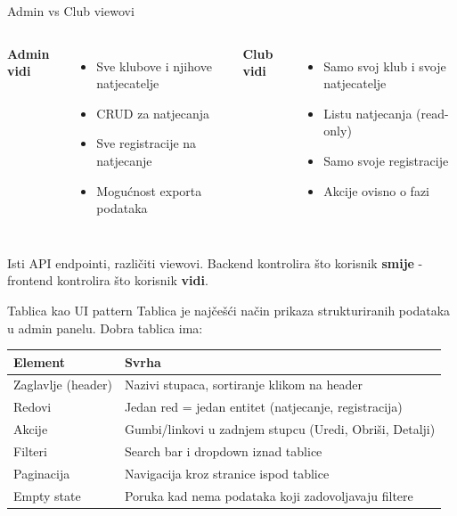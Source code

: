 \begin{frame}{Admin vs Club viewovi}
\begin{columns}[T]
\textbf{Admin vidi}
\begin{itemize}
  \item Sve klubove i njihove natjecatelje
  \item CRUD za natjecanja
  \item Sve registracije na natjecanje
  \item Mogućnost exporta podataka
\end{itemize}

\textbf{Club vidi}
\begin{itemize}
  \item Samo svoj klub i svoje natjecatelje
  \item Listu natjecanja (read-only)
  \item Samo svoje registracije
  \item Akcije ovisno o fazi
\end{itemize}
\end{columns}

\vspace{0.6em}
Isti API endpointi, različiti viewovi. Backend kontrolira što korisnik \textbf{smije} - frontend kontrolira što korisnik \textbf{vidi}.
\end{frame}

\begin{frame}{Tablica kao UI pattern}
Tablica je najčešći način prikaza strukturiranih podataka u admin panelu. Dobra tablica ima:

\vspace{0.4em}
\begin{tabular}{@{}lp{8cm}@{}}
  \toprule
  \textbf{Element} & \textbf{Svrha} \\
  \midrule
  Zaglavlje (header) & Nazivi stupaca, sortiranje klikom na header \\
  Redovi & Jedan red = jedan entitet (natjecanje, registracija) \\
  Akcije & Gumbi/linkovi u zadnjem stupcu (Uredi, Obriši, Detalji) \\
  Filteri & Search bar i dropdown iznad tablice \\
  Paginacija & Navigacija kroz stranice ispod tablice \\
  Empty state & Poruka kad nema podataka koji zadovoljavaju filtere \\
  \bottomrule
\end{tabular}
\end{frame}

